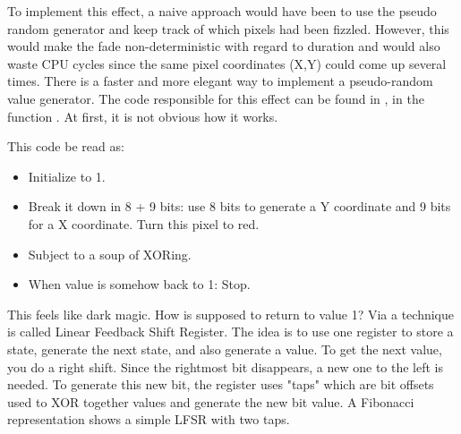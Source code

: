 To implement this effect, a naive approach would have been to use the pseudo random generator  and keep track of which pixels had been fizzled. However, this would make the fade non-deterministic with regard to duration and would also waste CPU cycles since the same pixel coordinates (X,Y) could come up several times. There is a faster and more elegant way to implement a pseudo-random value generator. The code responsible for this effect can be found in , in the function . At first, it is not obvious how it works.\\
\par
\begin{minipage}{\textwidth}

\end{minipage}
\par
This code be read as:\\
\begin{itemize}
\item Initialize  to 1.
\item Break it down in 8 + 9 bits: use 8 bits to generate a Y coordinate and 9 bits for a X coordinate. Turn this pixel to red.
\item Subject  to a soup of XORing.
\item When  value is somehow back to 1: Stop.
\end{itemize}        
This feels like dark magic. How is  supposed to return to value 1? Via a technique is called Linear Feedback Shift Register. The idea is to use one register to store a state, generate the next state, and also generate a value. To get the next value, you do a right shift. Since the rightmost bit disappears, a new one to the left is needed. To generate this new bit, the register uses "taps" which are bit offsets used to XOR together values and generate the new bit value. A Fibonacci representation shows a simple LFSR with two taps.\\
\par

